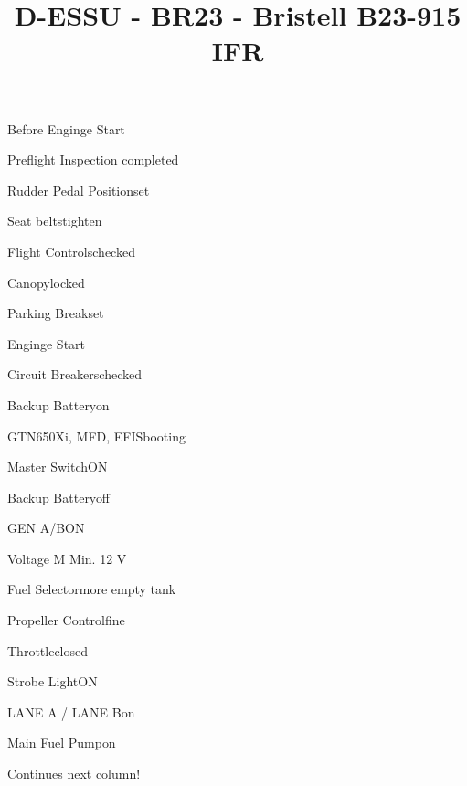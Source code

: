 \def\papersize{5}




\title{D-ESSU  -  BR23  -  Bristell B23-915 IFR}

\begin{checklist}{Before Enginge Start}
  \item{Preflight Inspection  }{completed}
  \item{Rudder Pedal Position}{set}
  \item{Seat belts}{tighten}
  \item{Flight Controls}{checked}
  \item{Canopy}{locked}
  \item{Parking Break}{set}
\end{checklist}

\begin{checklist}{Enginge Start}
  \item{Circuit Breakers}{checked}
  \item{Backup Battery}{on}
  \item{GTN650Xi, MFD, EFIS}{booting}

  \item{Master Switch}{ON}


  \item{Backup Battery}{off}
  \item{GEN A/B}{ON}
  \item{Voltage M }{Min. 12 V}
  \item{Fuel Selector}{more empty tank}
  \item{Propeller Control}{fine}
  \item{Throttle}{closed}
  \item{Strobe Light}{ON}
  \item{LANE A / LANE B}{on}
  \item{Main Fuel Pump}{on} 

Continues next column!
\end{checklist}

